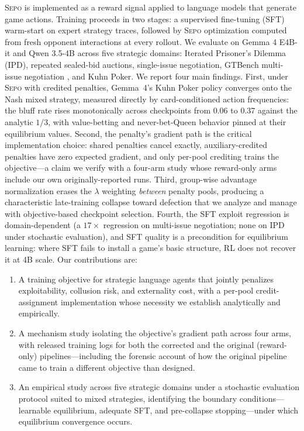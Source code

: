 \documentclass[letterpaper]{article} %
\newcommand{\sepo}{\textsc{Sepo}}
\begin{document}
\sepo{} is implemented as a reward signal applied to language models that generate game actions. Training proceeds in two stages: a supervised fine-tuning (SFT) warm-start on expert strategy traces, followed by \sepo{} optimization computed from fresh opponent interactions at every rollout. We evaluate on Gemma 4 E4B-it and Qwen 3.5-4B across five strategic domains: Iterated Prisoner's Dilemma (IPD), repeated sealed-bid auctions, single-issue negotiation, GTBench multi-issue negotiation \citep{wu2024gtbench}, and Kuhn Poker.
We report four main findings. First, under \sepo{} with credited penalties, Gemma~4's Kuhn Poker policy converges onto the Nash mixed strategy, measured directly by card-conditioned action frequencies: the bluff rate rises monotonically across checkpoints from 0.06 to 0.37 against the analytic $1/3$, with value-betting and never-bet-Queen behavior pinned at their equilibrium values. Second, the penalty's gradient path is the critical implementation choice: shared penalties cancel exactly, auxiliary-credited penalties have zero expected gradient, and only per-pool crediting trains the objective---a claim we verify with a four-arm study whose reward-only arms include our own originally-reported runs. Third, group-wise advantage normalization erases the $\lambda$ weighting \emph{between} penalty pools, producing a characteristic late-training collapse toward defection that we analyze and manage with objective-based checkpoint selection. Fourth, the SFT exploit regression is domain-dependent (a $17\times$ regression on multi-issue negotiation; none on IPD under stochastic evaluation), and SFT quality is a precondition for equilibrium learning: where SFT fails to install a game's basic structure, RL does not recover it at 4B scale.
Our contributions are:
\begin{enumerate}
\item A training objective for strategic language agents that jointly penalizes exploitability, collusion risk, and externality cost, with a per-pool credit-assignment implementation whose necessity we establish analytically and empirically.
\item A mechanism study isolating the objective's gradient path across four arms, with released training logs for both the corrected and the original (reward-only) pipelines---including the forensic account of how the original pipeline came to train a different objective than designed.
\item An empirical study across five strategic domains under a stochastic evaluation protocol suited to mixed strategies, identifying the boundary conditions---learnable equilibrium, adequate SFT, and pre-collapse stopping---under which equilibrium convergence occurs.
\end{enumerate}
\end{document}
